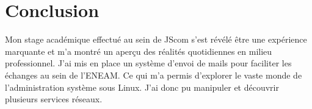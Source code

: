 \documentclass[a4paper,12pt,french]{report} %
\begin{document}
\chapter*{Conclusion}
Mon stage académique effectué au sein de JScom s'est révélé être une expérience marquante et m'a montré un aperçu des réalités quotidiennes en milieu professionnel.
J'ai mis en place un système d'envoi de mails pour faciliter les échanges au sein de l'ENEAM. Ce qui m'a permis d'explorer le vaste monde de l'administration système sous Linux. J'ai donc pu manipuler et découvrir plusieurs services réseaux. 


\nocite{ref1}
\nocite{ref2}
\nocite{ref3}
\nocite{ref4}
\nocite{ref5}
\nocite{ref6}
\nocite{ref7}
\nocite{ref8}
\nocite{ref9}
\nocite{ref10}
\nocite{ref11}
\nocite{ref12}
\nocite{ref13}
\nocite{ref14}
\nocite{ref15}
\nocite{ref16}

\end{document}

